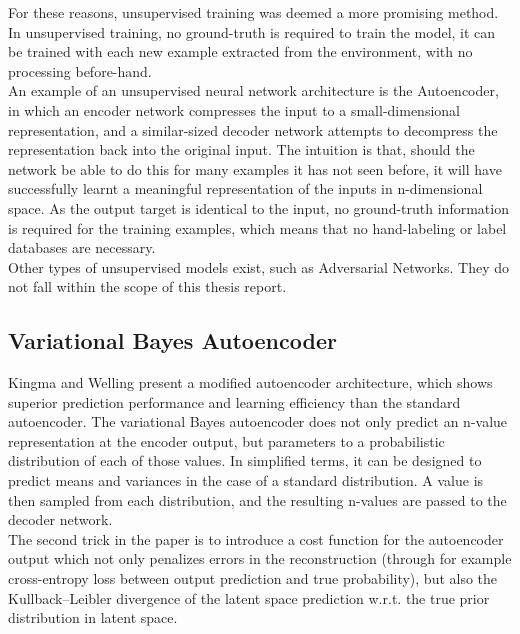 For these reasons, unsupervised training was deemed a more promising method. In unsupervised training, no ground-truth is required to train the model, it can be trained with each new example extracted from the environment, with no processing before-hand.\\

An example of an unsupervised neural network architecture is the Autoencoder, in which an encoder network compresses the input to a small-dimensional representation, and a similar-sized decoder network attempts to decompress the representation back into the original input. The intuition is that, should the network be able to do this for many examples it has not seen before, it will have successfully learnt a meaningful representation of the inputs in n-dimensional space. As the output target is identical to the input, no ground-truth information is required for the training examples, which means that no hand-labeling or label databases are necessary.\\

Other types of unsupervised models exist, such as Adversarial Networks. They do not fall within the scope of this thesis report.

\subsection{Variational Bayes Autoencoder}
\label{subsec:variational-bayes}

Kingma and Welling \cite{variational-autoencoder} present a modified autoencoder architecture, which shows superior prediction performance and learning efficiency than the standard autoencoder. The variational Bayes autoencoder does not only predict an n-value representation at the encoder output, but parameters to a probabilistic distribution of each of those values. In simplified terms, it can be designed to predict means and variances in the case of a standard distribution. A value is then sampled from each distribution, and the resulting n-values are passed to the decoder network.\\

The second trick in the paper \cite{variational-autoencoder} is to introduce a cost function for the autoencoder output which not only penalizes errors in the reconstruction (through for example cross-entropy loss between output prediction and true probability), but also the Kullback–Leibler divergence of the latent space prediction w.r.t. the true prior distribution in latent space.\\

